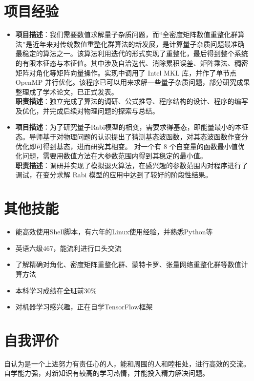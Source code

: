 \documentclass{resume}
\begin{document}
\section{项目经验}
\begin{itemize}%
\item {}
{\textbf{项目描述}：我们需要数值求解量子杂质问题，而“全密度矩阵数值重整化群算法”是近年来对传统数值重整化群算法的新发展，是计算量子杂质问题最准确最稳定的算法之一。该算法利用迭代的形式实现了重整化，最后得到整个系统的有限本征态与本征值。其中涉及自洽迭代、消除累积误差、矩阵乘法、稠密矩阵对⻆化等矩阵向量操作。实现中调用了 Intel MKL 库，并作了单节点 OpenMP 并行优化。该程序已可以用来求解一些量子杂质问题，部分研究成果整理成了学术论文，已正式发表。}\\
\textbf{职责描述}：独立完成了算法的调研、公式推导、程序结构的设计、程序的编写及优化，并完成后续对物理问题的探索与总结。
\item
{}
\textbf{项目描述}：为了研究量子Rabi模型的相变，需要求得基态，即能量最小的本征态。导师基于对物理问题的认识提出了猜测基态波函数，对其态波函数作变分优化即可得到基态，进而研究其相变。 对一个有 8 个自变量的函数最小值优化问题，需要用数值方法在大参数范围内得到其稳定的最小值。\\
\textbf{职责描述}：调研并实现了模拟退火算法，在感兴趣的参数范围内对程序进行了调试，在变分求解 Rabi 模型的应用中达到了较好的阶段性结果。
\end{itemize}

\section{其他技能}
\begin{itemize}%
\item 能高效使用Shell脚本，有六年的Linux使用经验，并熟悉Python等
\item 英语六级467，能流利进行口头交流
\item 了解精确对角化、密度矩阵重整化群、蒙特卡罗、张量网络重整化群等数值计算方法
\item 本科学习成绩在全班前30\%
\item 对机器学习感兴趣，正在自学TensorFlow框架
\end{itemize}

\section{自我评价}
\qquad 自认为是一个上进努力有责任心的人，能和周围的人和睦相处，进行高效的交流。自学能力强，对新知识有较高的学习热情，并能投入精力解决问题。


%  
\end{document}

